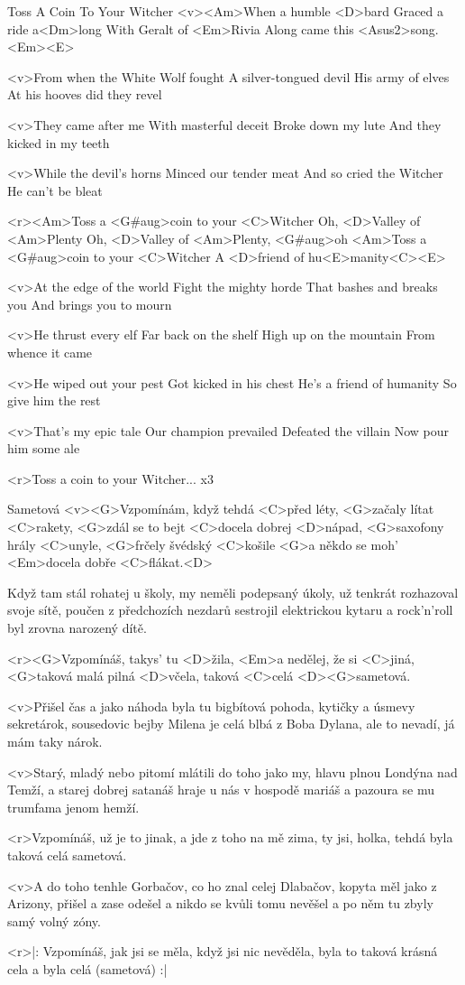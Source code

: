 \begin{song}{93}{Toss A Coin To Your Witcher}{}
	<v><Am>When a humble <D>bard
	Graced a ride a<Dm>long
	With Geralt of <Em>Rivia
	Along came this <Asus2>song. <Em><E>

	<v>From when the White Wolf fought
	A silver-tongued devil
	His army of elves
	At his hooves did they revel

	<v>They came after me
	With masterful deceit
	Broke down my lute
	And they kicked in my teeth

	<v>While the devil's horns
	Minced our tender meat
	And so cried the Witcher
	He can't be bleat

	<r><Am>Toss a <G#aug>coin to your <C>Witcher
	Oh, <D>Valley of <Am>Plenty
	Oh, <D>Valley of <Am>Plenty, <G#aug>oh
	<Am>Toss a <G#aug>coin to your <C>Witcher
	A <D>friend of hu<E>manity<C><E>

	<v>At the edge of the world
	Fight the mighty horde
	That bashes and breaks you
	And brings you to mourn

	<v>He thrust every elf
	Far back on the shelf
	High up on the mountain
	From whence it came

	<v>He wiped out your pest
	Got kicked in his chest
	He's a friend of humanity
	So give him the rest

	<v>That's my epic tale
	Our champion prevailed
	Defeated the villain
	Now pour him some ale

	<r>Toss a coin to your Witcher...
	x3
\end{song}

\begin{song}{94}{Sametová}{}
	<v><G>Vzpomínám, když tehdá <C>před léty, <G>začaly lítat <C>rakety,
	<G>zdál se to bejt <C>docela dobrej <D>nápad,
	<G>saxofony hrály <C>unyle, <G>frčely švédský <C>košile
	<G>a někdo se moh' <Em>docela dobře <C>flákat.<D>

	Když tam stál rohatej u školy, my neměli podepsaný úkoly,
	už tenkrát rozhazoval svoje sítě,
	poučen z předchozích nezdarů sestrojil elektrickou kytaru 
	a rock'n'roll byl zrovna narozený dítě.

	<r><G>Vzpomínáš, takys' tu <D>žila, <Em>a nedělej, že si <C>jiná,
	<G>taková malá pilná <D>včela, taková <C>celá <D><G>sametová.

	<v>Přišel čas a jako náhoda byla tu bigbítová pohoda,
	kytičky a úsmevy sekretárok,
	sousedovic bejby Milena je celá blbá z Boba Dylana,
	ale to nevadí, já mám taky nárok.

	<v>Starý, mladý nebo pitomí mlátili do toho jako my,
	hlavu plnou Londýna nad Temží,
	a starej dobrej satanáš hraje u nás v hospodě mariáš
	a pazoura se mu trumfama jenom hemží.

	<r>Vzpomínáš, už je to jinak, a jde z toho na mě zima,
	ty jsi, holka, tehdá byla taková celá sametová.

	<v>A do toho tenhle Gorbačov, co ho znal celej Dlabačov,
	kopyta měl jako z Arizony,
	přišel a zase odešel a nikdo se kvůli tomu nevěšel
	a po něm tu zbyly samý volný zóny.

	<r>|: Vzpomínáš, jak jsi se měla, když jsi nic nevěděla,
	byla to taková krásná cela a byla celá (sametová) :|
\end{song}

